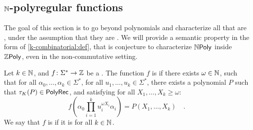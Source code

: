 \subsection{$\mathbb{N}$-polyregular functions}

The goal of this section is to go beyond polynomials and characterize all
 that are , under the
assumption that they are . We will provide a semantic property
in the form of \cref{k-combinatorial:def}, that is conjecture to characterize
$\NPoly$ inside $\ZPoly$, even in the non-commutative setting.

\begin{definition}
    \label{k-combinatorial:def}
    Let $k \in \mathbb{N}$, and $f \colon \Sigma^* \to \mathbb{Z}$
    be a . The function $f$ is 
     if there exists $\omega \in \mathbb{N}$,
    such that
    for all
    $\alpha_0, \dots, \alpha_k \in \Sigma^*$,
    for all $u_1, \dots, u_k \in \Sigma^*$,
    there exists a polynomial $P$
    such that $\tau_{K}(P) \in \mathsf{PolyRec}$, and
    satisfying for all $X_1, \dots, X_k \geq \omega$:
    \begin{equation*}
        f
        \left(
            \alpha_0 \prod_{i = 1}^k u_i^{\omega X_i} \alpha_i
        \right)
        = 
        P(X_1, \dots, X_k) \quad .
    \end{equation*}
    We say that $f$ is 
    if it is  for all $k \in \mathbb{N}$.
\end{definition}

